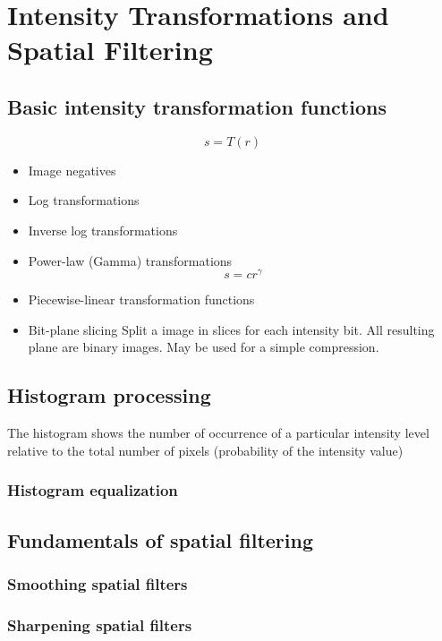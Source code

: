 \section{Intensity Transformations and Spatial Filtering }

\subsection{Basic intensity transformation functions}
\begin{equation}
s = T(r)
\end{equation}

\begin{itemize}
	\item Image negatives
	\item Log transformations
	\item Inverse log transformations
	\item Power-law (Gamma) transformations
		\begin{equation}
			s = c r^\gamma
		\end{equation}
	\item Piecewise-linear transformation functions
	\item Bit-plane slicing
		Split a image in slices for each intensity bit.  All resulting plane are binary images.
		May be used for a simple compression.
	
\end{itemize}

\subsection{Histogram processing}
The histogram shows the number of occurrence of a particular intensity level relative to the total number of pixels (probability of the intensity value)
\subsubsection{Histogram equalization}

\subsection{Fundamentals of spatial filtering}
\subsubsection{Smoothing spatial filters}
\subsubsection{Sharpening spatial filters}
